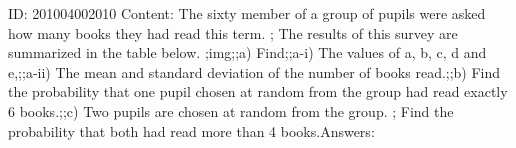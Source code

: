 \documentclass{article}
\begin{document}
ID: 201004002010
Content:
The sixty member of a group of pupils were asked how many books they had read this term. ; The results of this survey are summarized in the table below. ;img;;a) Find;;a-i) The values of a, b, c, d and e,;;a-ii) The mean and standard deviation of the number of books read.;;b) Find the probability that one pupil chosen at random from the group had read exactly 6 books.;;c) Two pupils are chosen at random from the group. ; Find the probability that both had read more than 4 books.Answers:
\end{document}
